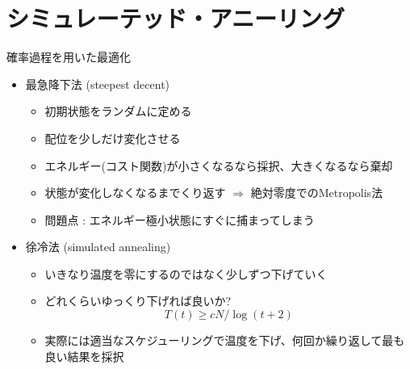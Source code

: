 \section{シミュレーテッド・アニーリング}

\begin{frame}[t,fragile]{確率過程を用いた最適化}
  \begin{itemize}
    \setlength{\itemsep}{1em}
  \item 最急降下法 (steepest decent)
    \begin{itemize}
    \item 初期状態をランダムに定める
    \item 配位を少しだけ変化させる
    \item エネルギー(コスト関数)が小さくなるなら採択、大きくなるなら棄却
    \item 状態が変化しなくなるまでくり返す $\Rightarrow$ 絶対零度でのMetropolis法
    \item 問題点 : エネルギー極小状態にすぐに捕まってしまう
    \end{itemize}
  \item 徐冷法 (simulated annealing)
    \begin{itemize}
    \item いきなり温度を零にするのではなく少しずつ下げていく
    \item どれくらいゆっくり下げれば良いか?
      \[
      T(t) \ge cN / \log(t+2)
      \]
    \item 実際には適当なスケジューリングで温度を下げ、何回か繰り返して最も良い結果を採択
    \end{itemize}
  \end{itemize}
\end{frame}

